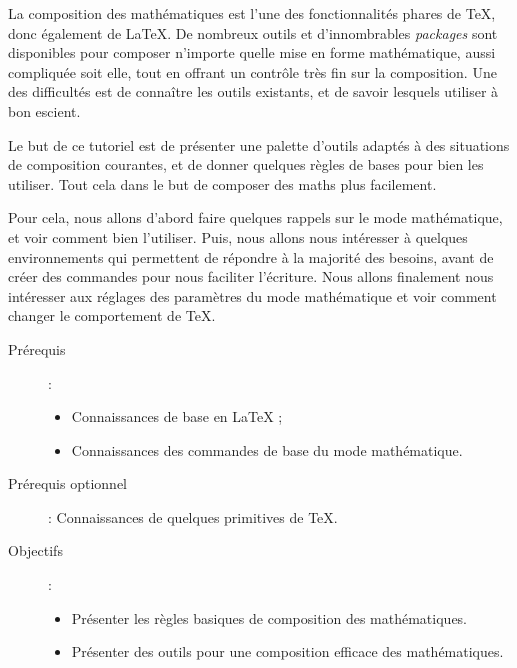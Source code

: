 
La composition des mathématiques est l’une des fonctionnalités phares de TeX, donc également de LaTeX. De nombreux outils et d’innombrables \emph{packages} sont disponibles pour composer n’importe quelle mise en forme mathématique, aussi compliquée soit elle, tout en offrant un contrôle très fin sur la composition. Une des difficultés est de connaître les outils existants, et de savoir lesquels utiliser à bon escient.

Le but de ce tutoriel est de présenter une palette d'outils adaptés à des situations de composition courantes, et de donner quelques règles de bases pour bien les utiliser. Tout cela dans le but de composer des maths plus facilement.

Pour cela, nous allons d’abord faire quelques rappels sur le mode mathématique, et voir comment bien l’utiliser. Puis, nous allons nous intéresser à quelques environnements qui permettent de répondre à la majorité des besoins, avant de créer des commandes pour nous faciliter l’écriture. Nous allons finalement nous intéresser aux réglages des paramètres du mode mathématique et voir comment changer le comportement de TeX.

\begin{Information}
\begin{description}
	\item[Prérequis] : 
		\begin{itemize}
			\item Connaissances de base en LaTeX ;
			\item Connaissances des commandes de base du mode mathématique.	
		\end{itemize}
	\item[Prérequis optionnel] : Connaissances de quelques primitives de TeX.
	\item[Objectifs] : 
		\begin{itemize}
			\item Présenter les règles basiques de composition des mathématiques.
			\item Présenter des outils pour une composition efficace des mathématiques.
		\end{itemize}
\end{description}
\end{Information}
